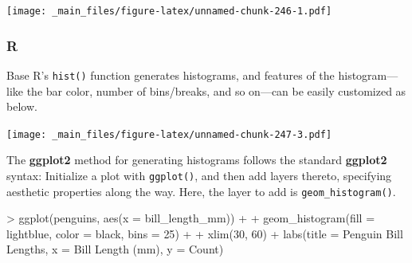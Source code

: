 \documentclass[
]{book}
\newenvironment{Shaded}{\begin{snugshade}}{\end{snugshade}}
\newcommand{\AttributeTok}[1]{\textcolor[rgb]{0.77,0.63,0.00}{#1}}
\newcommand{\DecValTok}[1]{\textcolor[rgb]{0.00,0.00,0.81}{#1}}
\newcommand{\FunctionTok}[1]{\textcolor[rgb]{0.00,0.00,0.00}{#1}}
\newcommand{\NormalTok}[1]{#1}
\newcommand{\SpecialCharTok}[1]{\textcolor[rgb]{0.00,0.00,0.00}{#1}}
\newcommand{\StringTok}[1]{\textcolor[rgb]{0.31,0.60,0.02}{#1}}
\begin{document}
\texttt{[image: \_main\_files/figure-latex/unnamed-chunk-246-1.pdf]}

\hypertarget{r-39}{%
\subsubsection*{R}\label{r-39}}

Base R's \texttt{hist()} function generates histograms, and features of the histogram---like the bar color, number of bins/breaks, and so on---can be easily customized as below.

\begin{Shaded}
\end{Shaded}

\texttt{[image: \_main\_files/figure-latex/unnamed-chunk-247-3.pdf]}

The \textbf{ggplot2} method for generating histograms follows the standard \textbf{ggplot2} syntax: Initialize a plot with \texttt{ggplot()}, and then add layers thereto, specifying aesthetic properties along the way. Here, the layer to add is \texttt{geom\_histogram()}.

\begin{Shaded}
\begin{Highlighting}[]
\SpecialCharTok{\textgreater{}} \FunctionTok{ggplot}\NormalTok{(penguins, }\FunctionTok{aes}\NormalTok{(}\AttributeTok{x =}\NormalTok{ bill\_length\_mm)) }\SpecialCharTok{+}
\SpecialCharTok{+}   \FunctionTok{geom\_histogram}\NormalTok{(}\AttributeTok{fill =} \StringTok{\textquotesingle{}lightblue\textquotesingle{}}\NormalTok{, }\AttributeTok{color =} \StringTok{\textquotesingle{}black\textquotesingle{}}\NormalTok{, }\AttributeTok{bins =} \DecValTok{25}\NormalTok{) }\SpecialCharTok{+}
\SpecialCharTok{+}   \FunctionTok{xlim}\NormalTok{(}\DecValTok{30}\NormalTok{, }\DecValTok{60}\NormalTok{) }\SpecialCharTok{+} \FunctionTok{labs}\NormalTok{(}\AttributeTok{title =} \StringTok{\textquotesingle{}Penguin Bill Lengths\textquotesingle{}}\NormalTok{, }\AttributeTok{x =} \StringTok{\textquotesingle{}Bill Length (mm)\textquotesingle{}}\NormalTok{, }\AttributeTok{y =} \StringTok{\textquotesingle{}Count\textquotesingle{}}\NormalTok{)}
\end{Highlighting}
\end{Shaded}
\end{document}
